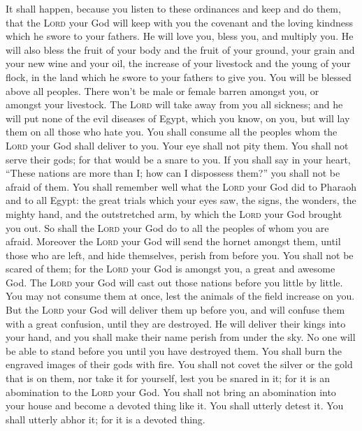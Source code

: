  It shall happen, because you listen to these ordinances
and keep and do them, that the \textsc{Lord} your God will keep with you
the covenant and the loving kindness which he swore to your fathers.
 He will love you, bless you, and multiply you. He will
also bless the fruit of your body and the fruit of your ground, your
grain and your new wine and your oil, the increase of your livestock and
the young of your flock, in the land which he swore to your fathers to
give you.  You will be blessed above all peoples. There
won't be male or female barren amongst you, or amongst your livestock.
 The \textsc{Lord} will take away from you all sickness;
and he will put none of the evil diseases of Egypt, which you know, on
you, but will lay them on all those who hate you.  You
shall consume all the peoples whom the \textsc{Lord} your God shall
deliver to you. Your eye shall not pity them. You shall not serve their
gods; for that would be a snare to you.  If you shall say
in your heart, ``These nations are more than I; how can I dispossess
them?''  you shall not be afraid of them. You shall
remember well what the \textsc{Lord} your God did to Pharaoh and to all
Egypt:  the great trials which your eyes saw, the signs,
the wonders, the mighty hand, and the outstretched arm, by which the
\textsc{Lord} your God brought you out. So shall the \textsc{Lord} your
God do to all the peoples of whom you are afraid. 
Moreover the \textsc{Lord} your God will send the hornet amongst them,
until those who are left, and hide themselves, perish from before you.
 You shall not be scared of them; for the \textsc{Lord}
your God is amongst you, a great and awesome God.  The
\textsc{Lord} your God will cast out those nations before you little by
little. You may not consume them at once, lest the animals of the field
increase on you.  But the \textsc{Lord} your God will
deliver them up before you, and will confuse them with a great
confusion, until they are destroyed.  He will deliver
their kings into your hand, and you shall make their name perish from
under the sky. No one will be able to stand before you until you have
destroyed them.  You shall burn the engraved images of
their gods with fire. You shall not covet the silver or the gold that is
on them, nor take it for yourself, lest you be snared in it; for it is
an abomination to the \textsc{Lord} your God.  You shall
not bring an abomination into your house and become a devoted thing like
it. You shall utterly detest it. You shall utterly abhor it; for it is a
devoted thing.


